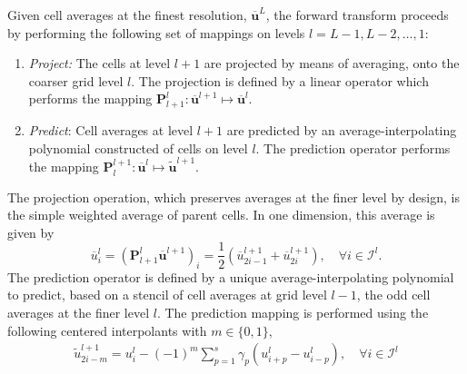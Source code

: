 \documentclass[]{article}
\begin{document}
        Given cell averages at the finest resolution, $\bm{\overline{u}}^{L}$, the forward
        transform proceeds by performing the following set of mappings on levels $l =
        L-1,L-2,\dots,1$:
        \begin{enumerate}
            \item[] \textit{Project:} The cells at level $l+1$ are projected
                by means of averaging, onto the coarser grid
                level $l$. The projection is defined by a linear operator
                which performs the mapping $\bm{P}_{l+1}^{l} : \overline{\bm{u}}^{l+1}
                \mapsto \overline{\bm{u}}^{l}$. 
            \item[] \textit{Predict}: Cell averages at level $l+1$
                are predicted by an average-interpolating polynomial constructed
                of cells on level $l$. The prediction operator performs
                the mapping $\bm{P}_{l}^{l+1} : \overline{\bm{u}}^{l} \mapsto
                \tilde{\bm{u}}^{l+1}$. 
        \end{enumerate}
        The projection operation, which preserves averages at the finer level by design, 
        is the simple weighted average of parent cells. In one dimension, this
        average is given by
        \begin{equation}
            \overline{u}^{l}_{i} = \left( \bm{P}_{l+1}^{l}
            \overline{\bm{u}}^{l+1} \right)_{i} = \frac{1}{2} (
            \overline{u}^{l+1}_{2i-1} + \overline{u}^{l+1}_{2i} ), \quad \forall
            i \in \bm{\mathcal{I}}^{l}.
        \end{equation}
        The prediction operator is defined by a unique average-interpolating
        polynomial to predict, based on a stencil of cell averages at grid level
        $l-1$, the odd cell averages at the finer level $l$. The prediction
        mapping is performed using the following centered interpolants with
        $m\in\{0,1\}$,
        \begin{align}
            \tilde{u}_{2i-m}^{l+1} = u_{i}^{l} - (-1)^{m} \sum_{p=1}^{s} \gamma_{p} \left(
                u^{l}_{i+p} - u^{l}_{i-p} \right), \quad \forall i \in \bm{\mathcal{I}}^{l}
            \label{prediction}
        \end{align}
\end{document}

